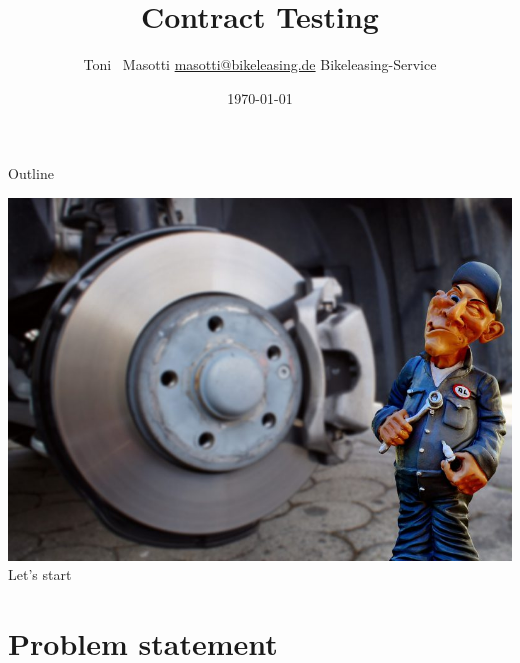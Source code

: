 


\title[Contract Testing]{Contract Testing }
\author[Toni Masotti]{\texorpdfstring{Toni ~Masotti  \newline \url{masotti@bikeleasing.de} \newline Bikeleasing-Service}{Toni Masotti}}
\date{\today}




	\begin{frame}
		\maketitle
	\end{frame}

	\begin{frame}{Outline}
		\tableofcontents[hideallsubsections]
	\end{frame}


	\AtBeginSection[ ]
	{
		\frame{\tableofcontents[currentsection]}
	}

	\begin{frame}
		\centering\includegraphics[width=.8\textwidth]{./assets/titelbild.jpg}
		\newline
		\huge{Let's start}
	\end{frame}


	\section{Problem statement}

